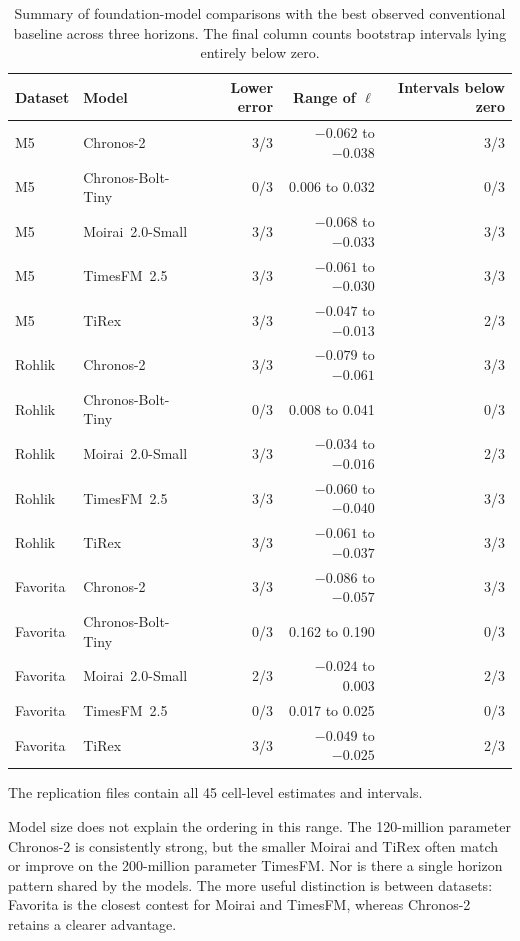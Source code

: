 \begin{table}[htbp]
\centering
\caption{Summary of foundation-model comparisons with the best observed
conventional baseline across three horizons. The final column counts bootstrap
intervals lying entirely below zero.}
\label{tab:sourceb-paired}
\small
\begin{tabular}{llrrr}
\toprule
Dataset & Model & Lower error & Range of $\ell$ & Intervals below zero \\
\midrule
M5 & Chronos-2 & 3/3 & $-0.062$ to $-0.038$ & 3/3 \\
M5 & Chronos-Bolt-Tiny & 0/3 & 0.006 to 0.032 & 0/3 \\
M5 & Moirai~2.0-Small & 3/3 & $-0.068$ to $-0.033$ & 3/3 \\
M5 & TimesFM~2.5 & 3/3 & $-0.061$ to $-0.030$ & 3/3 \\
M5 & TiRex & 3/3 & $-0.047$ to $-0.013$ & 2/3 \\
\addlinespace
Rohlik & Chronos-2 & 3/3 & $-0.079$ to $-0.061$ & 3/3 \\
Rohlik & Chronos-Bolt-Tiny & 0/3 & 0.008 to 0.041 & 0/3 \\
Rohlik & Moirai~2.0-Small & 3/3 & $-0.034$ to $-0.016$ & 2/3 \\
Rohlik & TimesFM~2.5 & 3/3 & $-0.060$ to $-0.040$ & 3/3 \\
Rohlik & TiRex & 3/3 & $-0.061$ to $-0.037$ & 3/3 \\
\addlinespace
Favorita & Chronos-2 & 3/3 & $-0.086$ to $-0.057$ & 3/3 \\
Favorita & Chronos-Bolt-Tiny & 0/3 & 0.162 to 0.190 & 0/3 \\
Favorita & Moirai~2.0-Small & 2/3 & $-0.024$ to 0.003 & 2/3 \\
Favorita & TimesFM~2.5 & 0/3 & 0.017 to 0.025 & 0/3 \\
Favorita & TiRex & 3/3 & $-0.049$ to $-0.025$ & 2/3 \\
\bottomrule
\end{tabular}
\end{table}

The replication files contain all 45 cell-level estimates and intervals.

Model size does not explain the ordering in this range. The 120-million
parameter Chronos-2 is consistently strong, but the smaller Moirai and TiRex
often match or improve on the 200-million parameter TimesFM. Nor is there a
single horizon pattern shared by the models. The more useful distinction is
between datasets: Favorita is the closest contest for Moirai and TimesFM,
whereas Chronos-2 retains a clearer advantage.

